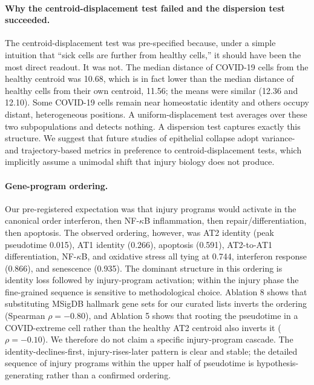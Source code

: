 \documentclass[11pt]{article}
\begin{document}
\paragraph{Why the centroid-displacement test failed and the dispersion test succeeded.} The centroid-displacement test was pre-specified because, under a simple intuition that ``sick cells are further from healthy cells,'' it should have been the most direct readout. It was not. The median distance of COVID-19 cells from the healthy centroid was 10.68, which is in fact lower than the median distance of healthy cells from their own centroid, 11.56; the means were similar (12.36 and 12.10). Some COVID-19 cells remain near homeostatic identity and others occupy distant, heterogeneous positions. A uniform-displacement test averages over these two subpopulations and detects nothing. A dispersion test captures exactly this structure. We suggest that future studies of epithelial collapse adopt variance- and trajectory-based metrics in preference to centroid-displacement tests, which implicitly assume a unimodal shift that injury biology does not produce.

\paragraph{Gene-program ordering.} Our pre-registered expectation was that injury programs would activate in the canonical order interferon, then NF-$\kappa$B inflammation, then repair/differentiation, then apoptosis. The observed ordering, however, was AT2 identity (peak pseudotime 0.015), AT1 identity (0.266), apoptosis (0.591), AT2-to-AT1 differentiation, NF-$\kappa$B, and oxidative stress all tying at 0.744, interferon response (0.866), and senescence (0.935). The dominant structure in this ordering is identity loss followed by injury-program activation; within the injury phase the fine-grained sequence is sensitive to methodological choice. Ablation 8 shows that substituting MSigDB hallmark gene sets for our curated lists inverts the ordering (Spearman $\rho = -0.80$), and Ablation 5 shows that rooting the pseudotime in a COVID-extreme cell rather than the healthy AT2 centroid also inverts it ($\rho = -0.10$). We therefore do not claim a specific injury-program cascade. The identity-declines-first, injury-rises-later pattern is clear and stable; the detailed sequence of injury programs within the upper half of pseudotime is hypothesis-generating rather than a confirmed ordering.
\end{document}
